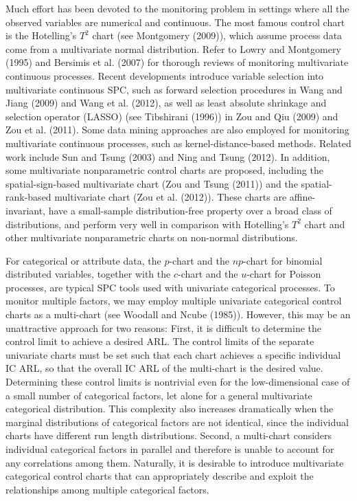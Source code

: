 Much effort has been devoted to the monitoring problem in settings where all the
observed variables are numerical and continuous. The most famous control chart is
the Hotelling's $T^2$ chart (see Montgomery (2009)), which assume process data come
from a multivariate normal distribution. Refer to Lowry and Montgomery (1995) and
Bersimis et al. (2007) for thorough reviews of monitoring multivariate continuous
processes. Recent developments introduce variable selection into multivariate
continuous SPC, such as forward selection procedures in Wang and Jiang (2009) and
Wang et al. (2012), as well as least absolute shrinkage and selection operator
(LASSO) (see Tibshirani (1996)) in Zou and Qiu (2009) and Zou et al. (2011). Some
data mining approaches are also employed for monitoring multivariate continuous
processes, such as kernel-distance-based methods. Related work include Sun and Tsung
(2003) and Ning and Tsung (2012). In addition, some multivariate nonparametric
control charts are proposed, including the spatial-sign-based multivariate chart
(Zou and Tsung (2011)) and the spatial-rank-based multivariate chart (Zou et al.
(2012)). These charts are affine-invariant, have a small-sample distribution-free
property over a broad class of distributions, and perform very well in comparison
with Hotelling's $T^2$ chart and other multivariate nonparametric charts on
non-normal distributions.

For categorical or attribute data, the $p$-chart and the $np$-chart for binomial
distributed variables, together with the $c$-chart and the $u$-chart for Poisson
processes, are typical SPC tools used with univariate categorical processes. To
monitor multiple factors, we may employ multiple univariate categorical control
charts as a multi-chart (see Woodall and Ncube (1985)). However, this may be an
unattractive approach for two reasons: First, it is difficult to determine the
control limit to achieve a desired ARL. The control limits of the separate
univariate charts must be set such that each chart achieves a specific individual IC
ARL, so that the overall IC ARL of the multi-chart is the desired value. Determining
these control limits is nontrivial even for the low-dimensional case of a small
number of categorical factors, let alone for a general multivariate categorical
distribution. This complexity also increases dramatically when the marginal
distributions of categorical factors are not identical, since the individual charts
have different run length distributions. Second, a multi-chart considers individual
categorical factors in parallel and therefore is unable to account for any
correlations among them. Naturally, it is desirable to introduce multivariate
categorical control charts that can appropriately describe and exploit the
relationships among multiple categorical factors.

